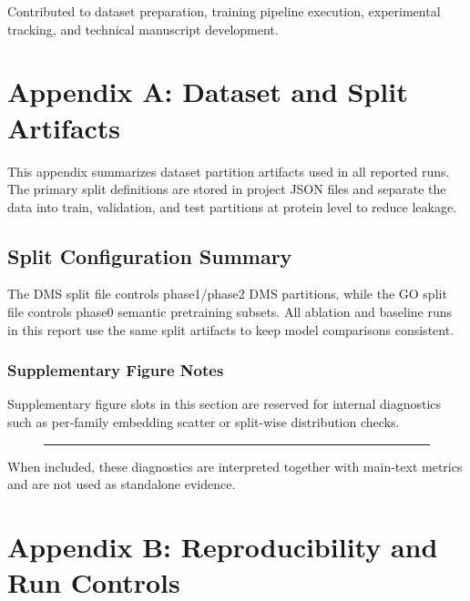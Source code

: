 \documentclass[unnumsec,webpdf,contemporary,large]{oup-authoring-template}%
\theoremstyle{thmstyleone}%
\theoremstyle{thmstyletwo}%
\theoremstyle{thmstylethree}%
\begin{document}
\begin{biography}{}{\author{Author 2.} Contributed to dataset preparation, training pipeline execution, experimental tracking, and technical manuscript development.}
\end{biography}


\begin{appendices}

\section{Appendix A: Dataset and Split Artifacts}\label{sec11}

This appendix summarizes dataset partition artifacts used in all reported runs. The primary split definitions are stored in project JSON files and separate the data into train, validation, and test partitions at protein level to reduce leakage.

\subsection{Split Configuration Summary}\label{subsec4}

The DMS split file controls phase1/phase2 DMS partitions, while the GO split file controls phase0 semantic pretraining subsets. All ablation and baseline runs in this report use the same split artifacts to keep model comparisons consistent.

\subsubsection{Supplementary Figure Notes}\label{subsubsec3}

Supplementary figure slots in this section are reserved for internal diagnostics such as per-family embedding scatter or split-wise distribution checks.

\begin{figure}[!h]
\centering
{\color{black!20}\rule{85pt}{92pt}}
\end{figure}

When included, these diagnostics are interpreted together with main-text metrics and are not used as standalone evidence.

\section{Appendix B: Reproducibility and Run Controls}\label{sec12}%


\end{appendices}
\end{document}
